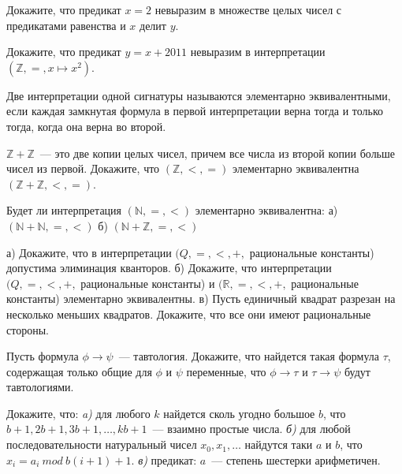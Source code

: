 \setcounter{curtask}{10}


\begin{task}
    Докажите, что предикат $x = 2$ невыразим в множестве целых чисел с
    предикатами равенства и $x$ делит $y$.
\end{task}

\begin{task}
    Докажите, что предикат $y = x + 2011$ невыразим в интерпретации
    $(\mathbb{Z}, =, x \mapsto x^2)$.
\end{task}

Две интерпретации одной сигнатуры называются элементарно
эквивалентными, если каждая замкнутая формула в первой интерпретации
верна тогда и только тогда, когда она верна во второй.

\begin{task}
	$\mathbb{Z} + \mathbb{Z}$~--- это две копии целых чисел, причем
    все числа из второй копии больше чисел из первой. Докажите, что
    $(\mathbb{Z}, <, =)$ элементарно эквивалентна $(\mathbb{Z} +
    \mathbb{Z}, <, =)$.
\end{task}

\begin{task}
    Будет ли интерпретация $(\mathbb{N}, =, <)$ элементарно
    эквивалентна:
    а) $(\mathbb{N} + \mathbb{N}, =, <)$
    б) $(\mathbb{N} + \mathbb{Z}, =, <)$
\end{task}

\begin{task}
    а) Докажите, что в интерпретации $(Q, =, <, +,$ рациональные
    константы) допустима элиминация кванторов.
    б) Докажите, что интерпретации $(Q, =, <, +,$ рациональные
    константы) и $(\mathbb{R}, =, <, +,$ рациональные константы)
    элементарно эквивалентны.
    в) Пусть единичный квадрат разрезан на несколько меньших
    квадратов. Докажите, что все они имеют рациональные стороны.
\end{task}


\breakline

\begin{ptask}{5}
    Пусть формула $\phi \rightarrow \psi$~--- тавтология. Докажите,
    что найдется такая формула $\tau$, содержащая только общие для
    $\phi$ и $\psi$ переменные, что $\phi \rightarrow \tau$ и
    $\tau \rightarrow \psi$ будут тавтологиями.
\end{ptask}

\begin{ptask}{9}
    Докажите, что:
    {\it a)} для любого $k$ найдется сколь угодно большое $b$, что
    $b + 1, 2b + 1, 3b + 1, \dots, kb + 1$~--- взаимно простые числа.
    {\it б)} для любой последовательности натуральный чисел $x_0, x_1,
    \dots$ найдутся таки $a$ и $b$, что $x_i = a_i~ mod ~ b(i + 1) +
    1$.
    {\it в)} предикат: $a$~--- степень шестерки арифметичен.
\end{ptask}